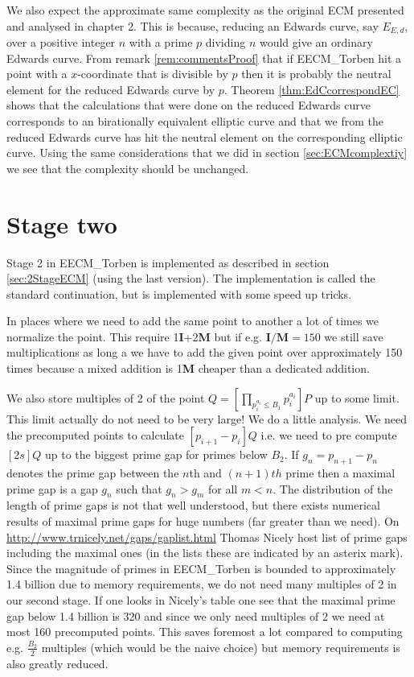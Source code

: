 We also expect the approximate same complexity as the original ECM presented and analysed in chapter 2. This is because, reducing an Edwards curve, say $E_{E,d}$, over a positive integer $n$ with a prime $p$ dividing $n$ would give an ordinary Edwards curve. From remark \ref{rem:commentsProof} that if EECM\_Torben hit a point with a $x$-coordinate that is divisible by $p$ then it is probably the neutral element for the reduced Edwards curve by $p$. Theorem \ref{thm:EdCcorrespondEC} shows that the calculations that were done on the reduced Edwards curve corresponds to an birationally equivalent elliptic curve and that we from the reduced Edwards curve has hit the neutral element on the corresponding elliptic curve. Using the same considerations that we did in section \ref{sec:ECMcomplextiy} we see that the complexity should be unchanged. 

\section{Stage two}\label{sec:implSecondStage}
Stage 2 in EECM\_Torben is implemented as described in section \ref{sec:2StageECM} (using the last version). The implementation is called the standard continuation, but is implemented with some speed up tricks. 

In places where we need to add the same point to another a lot of times we normalize the point. This require 1\textbf{I}+2\textbf{M} but if e.g. $\textbf{I}/\textbf{M}=150$ we still save multiplications as long a we have to add the given point over approximately 150 times because a mixed addition is 1\textbf{M} cheaper than a dedicated addition. 

We also store multiples of 2 of the point $Q=\left[ \prod_{p_i^{a_i}\leq B_1}p_i^{a_i}\right] P$ up to some limit. This limit actually do not need to be very large! We do a little analysis. We need the precomputed points to calculate $[p_{i+1}-p_i]Q$ i.e. we need to pre compute $[2s]Q$ up to the biggest prime gap for primes below $B_2$. If $g_n=p_{n+1}-p_n$ denotes the prime gap between the $n$th and $(n+1)th$ prime then a maximal prime gap is a gap $g_n$ such that $g_n>g_m$ for all $m<n$. The distribution of the length of prime gaps is not that well understood, but there exists numerical results of maximal prime gaps for huge numbers (far greater than we need). On \url{http://www.trnicely.net/gaps/gaplist.html} Thomas Nicely host list of prime gaps including the maximal ones (in the lists these are indicated by an asterix mark). Since the magnitude of primes in EECM\_Torben is bounded to approximately 1.4 billion due to memory requirements, we do not need many multiples of 2 in our second stage. If one looks in Nicely's table one see that the maximal prime gap below 1.4 billion is 320 and since we only need multiples of 2 we need at most 160 precomputed points. This saves foremost a lot compared to computing e.g. $\frac{B_2}{2}$ multiples (which would be the naive choice) but memory requirements is also greatly reduced. 

